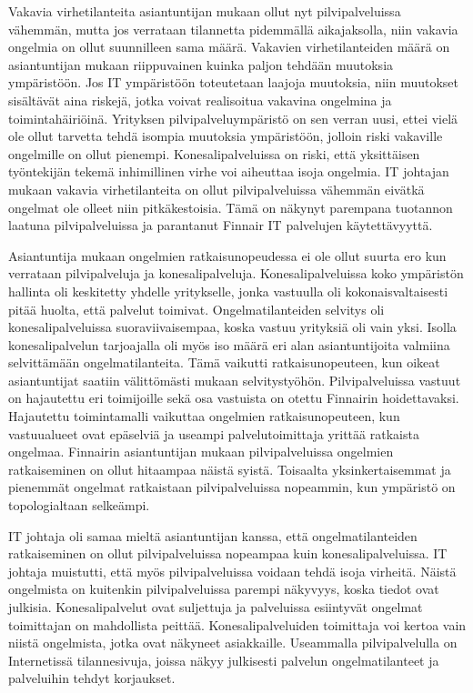 Vakavia virhetilanteita asiantuntijan mukaan ollut nyt pilvipalveluissa vähemmän, mutta jos verrataan tilannetta pidemmällä aikajaksolla, niin vakavia ongelmia on ollut suunnilleen sama määrä. Vakavien virhetilanteiden määrä on asiantuntijan mukaan riippuvainen kuinka paljon tehdään muutoksia ympäristöön. Jos IT ympäristöön toteutetaan laajoja muutoksia, niin muutokset sisältävät aina riskejä, jotka voivat realisoitua vakavina ongelmina ja toimintahäiriöinä. Yrityksen pilvipalveluympäristö on sen verran uusi, ettei vielä ole ollut tarvetta tehdä isompia muutoksia ympäristöön, jolloin riski vakaville ongelmille on ollut pienempi. Konesalipalveluissa on riski, että yksittäisen työntekijän tekemä inhimillinen virhe voi aiheuttaa isoja ongelmia. IT johtajan mukaan vakavia virhetilanteita on ollut pilvipalveluissa vähemmän eivätkä ongelmat ole olleet niin pitkäkestoisia. Tämä on näkynyt parempana tuotannon laatuna pilvipalveluissa ja parantanut Finnair IT palvelujen käytettävyyttä.

Asiantuntija mukaan ongelmien ratkaisunopeudessa ei ole ollut suurta ero kun verrataan pilvipalveluja ja konesalipalveluja. Konesalipalveluissa koko ympäristön hallinta oli keskitetty yhdelle yritykselle, jonka vastuulla oli kokonaisvaltaisesti pitää huolta, että palvelut toimivat. Ongelmatilanteiden selvitys oli konesalipalveluissa suoraviivaisempaa, koska vastuu yrityksiä oli vain yksi. Isolla konesalipalvelun tarjoajalla oli myös iso määrä eri alan asiantuntijoita valmiina selvittämään ongelmatilanteita. Tämä vaikutti ratkaisunopeuteen, kun oikeat asiantuntijat saatiin välittömästi mukaan selvitystyöhön. Pilvipalveluissa vastuut on hajautettu eri toimijoille sekä osa vastuista on otettu Finnairin hoidettavaksi. Hajautettu toimintamalli vaikuttaa ongelmien ratkaisunopeuteen, kun vastuualueet ovat epäselviä ja useampi palvelutoimittaja yrittää ratkaista ongelmaa. Finnairin asiantuntijan mukaan pilvipalveluissa ongelmien ratkaiseminen on ollut hitaampaa näistä syistä. Toisaalta yksinkertaisemmat ja pienemmät ongelmat ratkaistaan pilvipalveluissa nopeammin, kun ympäristö on topologialtaan selkeämpi.

IT johtaja oli samaa mieltä asiantuntijan kanssa, että ongelmatilanteiden ratkaiseminen on ollut pilvipalveluissa nopeampaa kuin konesalipalveluissa. IT johtaja muistutti, että myös pilvipalveluissa voidaan tehdä isoja virheitä. Näistä ongelmista on kuitenkin pilvipalveluissa parempi näkyvyys, koska tiedot ovat julkisia. Konesalipalvelut ovat suljettuja ja palveluissa esiintyvät ongelmat toimittajan on mahdollista peittää. Konesalipalveluiden toimittaja voi kertoa vain niistä ongelmista, jotka ovat näkyneet asiakkaille. Useammalla pilvipalvelulla on Internetissä tilannesivuja, joissa näkyy julkisesti palvelun ongelmatilanteet ja palveluihin tehdyt korjaukset.

